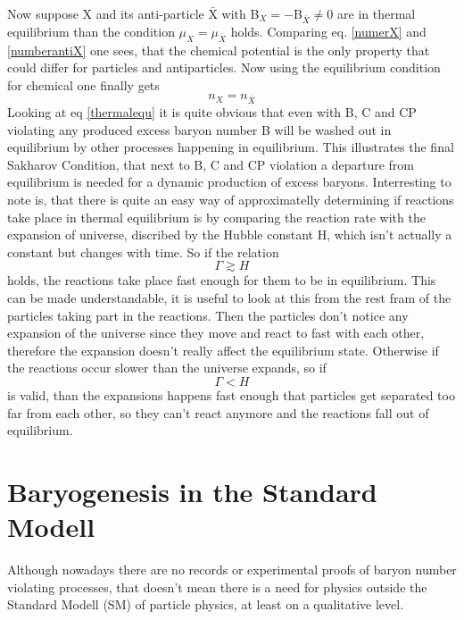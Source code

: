 Now suppose X and its anti-particle $\bar{\text{X}}$  with B$_X=-$B$_{\bar{X}}\neq0$ are in thermal equilibrium than the condition $\mu_X=\mu_{\bar{X}}$ holds. Comparing eq. \ref{numerX} and \ref{numberantiX} one sees, that the chemical potential is the only property that could differ for particles and antiparticles. Now using the equilibrium condition for chemical one finally gets
\begin{equation}
	n_X=n_{\bar{X}}
	\label{thermalequ}
\end{equation}
Looking at eq \ref{thermalequ} it is quite obvious that even with B, C and CP violating any produced excess baryon number B will be washed out in equilibrium by other processes happening in equilibrium. \newline
This illustrates the final Sakharov Condition, that next to B, C and CP violation a departure from equilibrium is needed for a dynamic production of excess baryons. \newline
Interresting to note is, that there is quite an easy way of approximatelly determining if reactions take place in thermal equilibrium is by comparing the reaction rate with the expansion of universe, discribed by the Hubble constant H, which isn't actually a constant but changes with time. So if the relation 
\begin{equation}
	\Gamma\gtrsim H
	\label{eq:rate_g_hubble}
\end{equation}
holds, the reactions take place fast enough for them to be in equilibrium. This can be made understandable, it is useful to look at this from the rest fram of the particles taking part in the reactions. Then the particles don't notice any expansion of the universe since they move and react to fast with each other, therefore the expansion doesn't really affect the equilibrium state. \newline
Otherwise if the reactions occur slower than the universe expands, so if 
\begin{equation}
	\Gamma<H
	\label{eq:rate_s_hubble}
\end{equation}
is valid, than the expansions happens fast enough that particles get separated too far from each other, so they can't react anymore and the reactions fall out of equilibrium.
\section{Baryogenesis in the Standard Modell}
Although nowadays there are no records or experimental proofs of baryon number violating processes, that doesn't mean there is a need for physics outside the Standard Modell (SM) of particle physics, at least on a qualitative level.
